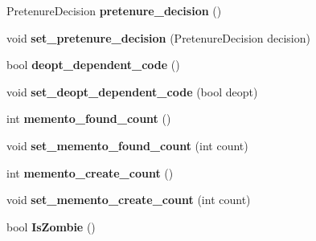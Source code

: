 \begin{DoxyCompactItemize}
\item 
Pretenure\+Decision {\bfseries pretenure\+\_\+decision} ()\hypertarget{classv8_1_1internal_1_1_allocation_site_a7103887124921d6ff4eb401bff563a52}{}\label{classv8_1_1internal_1_1_allocation_site_a7103887124921d6ff4eb401bff563a52}

\item 
void {\bfseries set\+\_\+pretenure\+\_\+decision} (Pretenure\+Decision decision)\hypertarget{classv8_1_1internal_1_1_allocation_site_a3eb7bfb649894bc1ea0875152aff118e}{}\label{classv8_1_1internal_1_1_allocation_site_a3eb7bfb649894bc1ea0875152aff118e}

\item 
bool {\bfseries deopt\+\_\+dependent\+\_\+code} ()\hypertarget{classv8_1_1internal_1_1_allocation_site_ad346c72b5d5c204cbb5ca3c5d42de25b}{}\label{classv8_1_1internal_1_1_allocation_site_ad346c72b5d5c204cbb5ca3c5d42de25b}

\item 
void {\bfseries set\+\_\+deopt\+\_\+dependent\+\_\+code} (bool deopt)\hypertarget{classv8_1_1internal_1_1_allocation_site_a6b6321178dbb71e389194b39a6ee51ee}{}\label{classv8_1_1internal_1_1_allocation_site_a6b6321178dbb71e389194b39a6ee51ee}

\item 
int {\bfseries memento\+\_\+found\+\_\+count} ()\hypertarget{classv8_1_1internal_1_1_allocation_site_a09e237ddea93fe5f26592f3f4d86d73b}{}\label{classv8_1_1internal_1_1_allocation_site_a09e237ddea93fe5f26592f3f4d86d73b}

\item 
void {\bfseries set\+\_\+memento\+\_\+found\+\_\+count} (int count)\hypertarget{classv8_1_1internal_1_1_allocation_site_ad74c42dccc41adcc6d7f2dd22fa56176}{}\label{classv8_1_1internal_1_1_allocation_site_ad74c42dccc41adcc6d7f2dd22fa56176}

\item 
int {\bfseries memento\+\_\+create\+\_\+count} ()\hypertarget{classv8_1_1internal_1_1_allocation_site_aa5dae1f833730f55ab548a2981c577fd}{}\label{classv8_1_1internal_1_1_allocation_site_aa5dae1f833730f55ab548a2981c577fd}

\item 
void {\bfseries set\+\_\+memento\+\_\+create\+\_\+count} (int count)\hypertarget{classv8_1_1internal_1_1_allocation_site_ab95f8e888faad709405944f3f5223378}{}\label{classv8_1_1internal_1_1_allocation_site_ab95f8e888faad709405944f3f5223378}

\item 
bool {\bfseries Is\+Zombie} ()\hypertarget{classv8_1_1internal_1_1_allocation_site_ab43e6d803b8a1f9b160936060e487542}{}\label{classv8_1_1internal_1_1_allocation_site_ab43e6d803b8a1f9b160936060e487542}


\end{DoxyCompactItemize}
